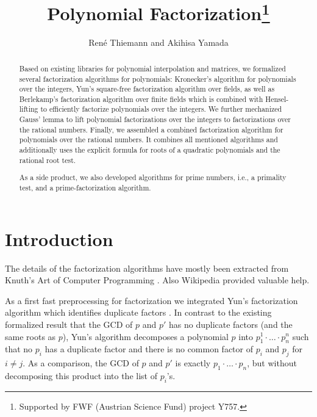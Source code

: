 \documentclass[11pt,a4paper]{article}
\begin{document}
\title{Polynomial Factorization\footnote{Supported by FWF (Austrian Science Fund) project Y757.}}
\author{Ren\'e Thiemann and Akihisa Yamada}
\maketitle

\begin{abstract}
Based on existing libraries for polynomial interpolation and matrices,
we formalized several factorization algorithms for polynomials: 
Kronecker's algorithm for polynomials over the integers, Yun's square-free factorization algorithm over fields, as well as Berlekamp's
factorization algorithm over finite fields which is combined with Hensel-lifting to 
efficiently factorize polynomials over the integers. 
We further mechanized Gauss' lemma to lift polynomial factorizations over the integers to
factorizations over the rational numbers.
Finally, we assembled a combined factorization algorithm for polynomials over the rational numbers.
It combines all mentioned algorithms and additionally uses the explicit formula for roots 
of a quadratic polynomials and the rational root test.

As a side product, we also developed algorithms for prime numbers, i.e., a primality test,
and a prime-factorization algorithm.
\end{abstract}

\tableofcontents

\section{Introduction}

The details of the factorization algorithms have mostly been extracted 
from Knuth's Art of Computer Programming
\cite{Knuth}. Also Wikipedia provided valuable help.

\medskip
As a first fast
preprocessing for factorization we integrated Yun's factorization algorithm which identifies duplicate
factors \cite{Yun}. In contrast to the existing formalized result that the GCD of $p$ and $p'$ has no
duplicate factors (and the same roots as $p$), Yun's algorithm decomposes a polynomial $p$ into
$p_1^1 \cdot \ldots \cdot p_n^n$ such that no $p_i$ has a duplicate factor and there is no common
factor of $p_i$ and $p_j$ for $i \neq j$. As a comparison, the GCD of $p$ and $p'$ is exactly
$p_1 \cdot \ldots \cdot p_n$, but without decomposing this product into the list of $p_i$'s.
\end{document}
